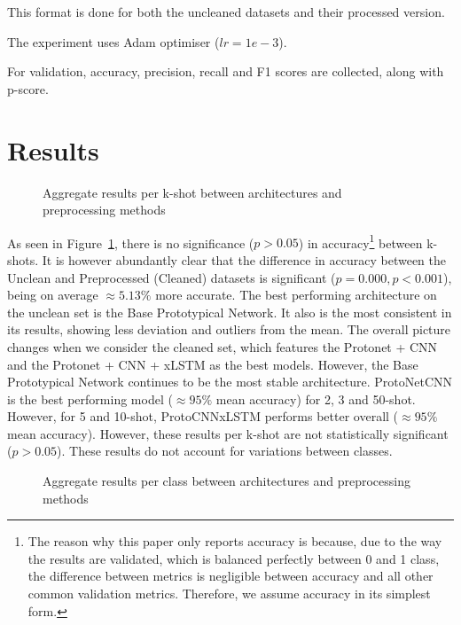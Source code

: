 \documentclass[11pt]{article}
\begin{document}
This format is done for both the uncleaned datasets and their processed version.

The experiment uses Adam optimiser (\(lr = 1e-3\)).

For validation, accuracy, precision, recall and F1 scores are collected, along with p-score. 

\section{Results}

\begin{figure}[h]
  \centering
  \resizebox{\linewidth}{!}{}
  \caption{Aggregate results per k-shot between architectures and preprocessing methods}
  \label{fig:boxplots_per_k-shot}
\end{figure}

As seen in Figure~\ref{fig:boxplots_per_k-shot}, there is no significance (\(p>0.05\))
in accuracy\footnote{The reason why this paper only reports accuracy is because, due to the way the results are validated, which is balanced perfectly between 0 and 1 class, the difference between metrics is negligible
between accuracy and all other common validation metrics. Therefore, we assume accuracy in its simplest form.}
between k-shots. It is however abundantly clear that the difference in accuracy between the Unclean and Preprocessed (Cleaned) datasets is significant (\(p = 0.000, p<0.001\)), being on average $\approx 5.13\%$ more accurate.
The best performing architecture on the unclean set is the Base Prototypical Network. It also is the most consistent in its results, showing less deviation and outliers from the mean. The overall picture changes when we consider the cleaned set, which features the Protonet + CNN and the Protonet + CNN + xLSTM as the best models. However, the Base Prototypical Network continues to be the most stable architecture.
ProtoNetCNN is the best performing model ($\approx95\%$ mean accuracy) for 2, 3 and 50-shot. However, for 5 and 10-shot, ProtoCNNxLSTM performs better overall ($\approx95\%$ mean accuracy). However, these results per k-shot
are not statistically significant (\(p>0.05\)). These results do not account for variations between classes.

\begin{figure}[h]
  \centering
  \resizebox{\linewidth}{!}{}
  \caption{Aggregate results per class between architectures and preprocessing methods}
    \label{fig:boxplot_per_class}
\end{figure}
\end{document}
